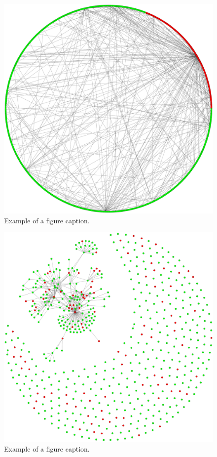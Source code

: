 \documentclass[conference]{IEEEtran}
\begin{document}
\begin{figure}[htbp]
 \centerline{\includegraphics[width=\columnwidth]{community-circular.png}}
 \caption{Example of a figure caption.}
\end{figure}

\begin{figure}[htbp]
 \centerline{\includegraphics[width=\columnwidth]{community_fr.png}}
 \caption{Example of a figure caption.}
\end{figure}
\end{document}
